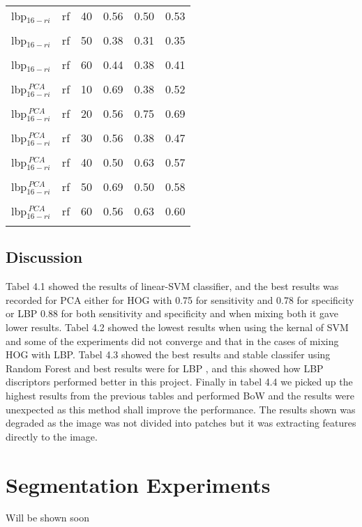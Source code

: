 \begin{table}
{\begin{tabular}{l c c  lcr}
 \acs{lbp}$_{16-ri}$ & \acs{rf} & 40 & 0.56 & 0.50 & 0.53 \\
 \multicolumn{6}{c}{}\\[-1.5ex]

 \acs{lbp}$_{16-ri}$ & \acs{rf} & 50 & 0.38 & 0.31 & 0.35 \\
 \multicolumn{6}{c}{}\\[-1.5ex]


 \acs{lbp}$_{16-ri}$ & \acs{rf} & 60 & 0.44 & 0.38 & 0.41 \\
 \multicolumn{6}{c}{}\\[-1.5ex]

\acs{lbp}$_{16-ri}^{~PCA}$ & \acs{rf} & 10 & 0.69 & 0.38 & 0.52  \\
 \multicolumn{5}{c}{}\\[-2ex]

\acs{lbp}$_{16-ri}^{~PCA}$ & \acs{rf} & 20 & 0.56 & 0.75 & 0.69  \\
 \multicolumn{5}{c}{}\\[-2ex]

\acs{lbp}$_{16-ri}^{~PCA}$ & \acs{rf} & 30 & 0.56 & 0.38 & 0.47  \\
 \multicolumn{5}{c}{}\\[-2ex]

\acs{lbp}$_{16-ri}^{~PCA}$ & \acs{rf} & 40 & 0.50 & 0.63 & 0.57  \\
 \multicolumn{5}{c}{}\\[-2ex]
 
 \acs{lbp}$_{16-ri}^{~PCA}$ & \acs{rf} & 50 & 0.69 & 0.50 & 0.58  \\
 \multicolumn{5}{c}{}\\[-2ex]

 \acs{lbp}$_{16-ri}^{~PCA}$ & \acs{rf} & 60 & 0.56 & 0.63 & 0.60  \\
 \multicolumn{5}{c}{}\\[-2ex]

\bottomrule
\end{tabular}
}
\label{tab:tab3}
\end{table}

\subsection{Discussion}
Tabel 4.1 showed the results of linear-SVM classifier, and the best results was recorded for PCA either for HOG with 0.75 for sensitivity and 0.78 for specificity or LBP 0.88 for both sensitivity and specificity and when mixing both it gave lower results. 
Tabel 4.2 showed the lowest results when using the kernal of SVM and some of the experiments did not converge and that in the cases of mixing HOG with LBP.
Tabel 4.3 showed the best results and stable classifer using Random Forest and best results were for LBP , and this showed how LBP discriptors performed better in this project.
Finally in tabel 4.4 we picked up the highest results from the previous tables and performed BoW and the results were unexpected as this method shall improve the performance.
The results shown was degraded as the image was not divided into patches but it was extracting features directly to the image.
\section{Segmentation Experiments}
Will be shown soon